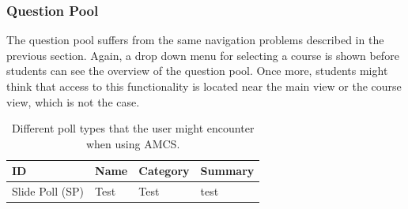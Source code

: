 \subsubsection{Question Pool}

The question pool suffers from the same navigation problems described in the previous section. Again, a drop down menu for selecting a course is shown before students can see the overview of the question pool. Once more, students might think that access to this functionality is located near the main view or the course view, which is not the case.



\begin{table}[t]
	{\renewcommand{\arraystretch}{2}
		\begin{tabular}{ | p{1cm} | p{2.5cm} |  p{2.5cm} |  p{6cm} |}
			\hline
			ID & Name & Category & Summary \\ \hline \hline
			Slide Poll (SP) & Test & Test & test \\ \hline
		\end{tabular}
	}
	\caption{Different poll types that the user might encounter when using AMCS.}
	\label{tab:problems}
\end{table}

